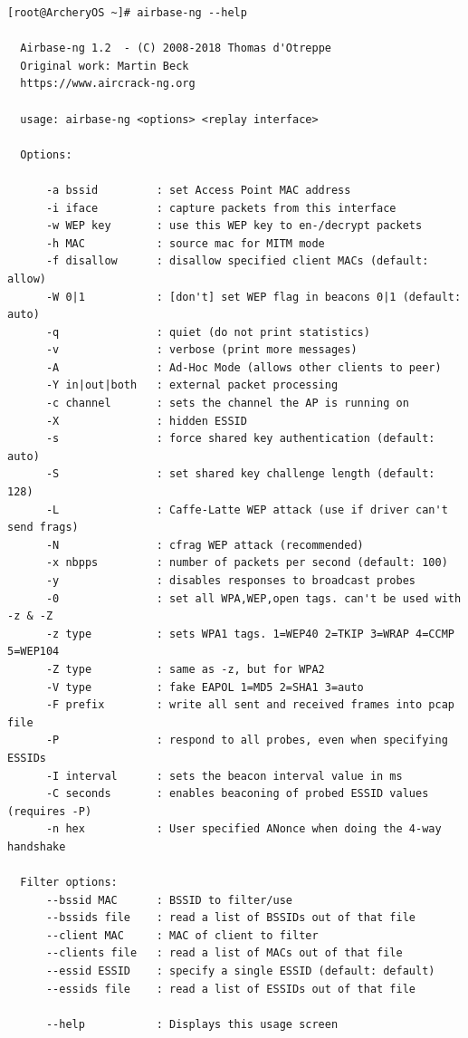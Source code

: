 \documentclass{article}
\begin{document}
\begin{lstlisting}
[root@ArcheryOS ~]# airbase-ng --help

  Airbase-ng 1.2  - (C) 2008-2018 Thomas d'Otreppe
  Original work: Martin Beck
  https://www.aircrack-ng.org

  usage: airbase-ng <options> <replay interface>

  Options:

      -a bssid         : set Access Point MAC address
      -i iface         : capture packets from this interface
      -w WEP key       : use this WEP key to en-/decrypt packets
      -h MAC           : source mac for MITM mode
      -f disallow      : disallow specified client MACs (default: allow)
      -W 0|1           : [don't] set WEP flag in beacons 0|1 (default: auto)
      -q               : quiet (do not print statistics)
      -v               : verbose (print more messages)
      -A               : Ad-Hoc Mode (allows other clients to peer)
      -Y in|out|both   : external packet processing
      -c channel       : sets the channel the AP is running on
      -X               : hidden ESSID
      -s               : force shared key authentication (default: auto)
      -S               : set shared key challenge length (default: 128)
      -L               : Caffe-Latte WEP attack (use if driver can't send frags)
      -N               : cfrag WEP attack (recommended)
      -x nbpps         : number of packets per second (default: 100)
      -y               : disables responses to broadcast probes
      -0               : set all WPA,WEP,open tags. can't be used with -z & -Z
      -z type          : sets WPA1 tags. 1=WEP40 2=TKIP 3=WRAP 4=CCMP 5=WEP104
      -Z type          : same as -z, but for WPA2
      -V type          : fake EAPOL 1=MD5 2=SHA1 3=auto
      -F prefix        : write all sent and received frames into pcap file
      -P               : respond to all probes, even when specifying ESSIDs
      -I interval      : sets the beacon interval value in ms
      -C seconds       : enables beaconing of probed ESSID values (requires -P)
      -n hex           : User specified ANonce when doing the 4-way handshake

  Filter options:
      --bssid MAC      : BSSID to filter/use
      --bssids file    : read a list of BSSIDs out of that file
      --client MAC     : MAC of client to filter
      --clients file   : read a list of MACs out of that file
      --essid ESSID    : specify a single ESSID (default: default)
      --essids file    : read a list of ESSIDs out of that file

      --help           : Displays this usage screen
\end{lstlisting}
\end{document}
